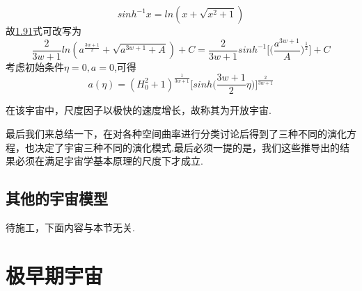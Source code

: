 \documentclass[a4paper]{book}
\begin{document}
\begin{equation}
	sinh^{-1}x=ln(x+\sqrt{x^2+1})
\end{equation}
故\hyperref[1.91]{1.91}式可改写为
\begin{equation}
	\frac{2}{3w+1}ln(a^{\frac{3w+1}{2}}+\sqrt{a^{3w+1}+A})+C=\frac{2}{3w+1}sinh^{-1}\Big[\Big(\frac{a^{3w+1}}{A}\Big)^{\frac{1}{2}}\Big]+C
\end{equation}
考虑初始条件$\eta=0,a=0$,可得
\begin{equation}
	a(\eta)=(H^2_0+1)^{\frac{1}{3w+1}}\Big[sinh\Big(\frac{3w+1}{2}\eta\Big)\Big]^{\frac{2}{3w+1}}
\end{equation}

在该宇宙中，尺度因子以极快的速度增长，故称其为开放宇宙.\par 
最后我们来总结一下，在对各种空间曲率进行分类讨论后得到了三种不同的演化方程，也决定了宇宙三种不同的演化模式.最后必须一提的是，我们这些推导出的结果必须在满足宇宙学基本原理的尺度下才成立.
\section{其他的宇宙模型}
待施工，下面内容与本节无关.\par
\lipsum[1-3]
\chapter{极早期宇宙}



















\end{document}

